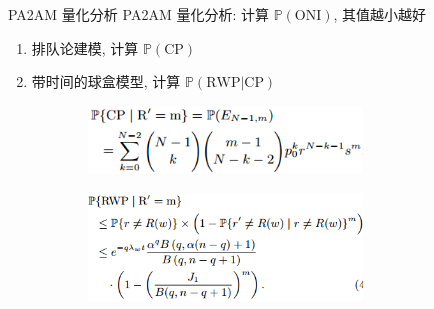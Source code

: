 \begin{frame}{PA2AM 量化分析}
  PA2AM 量化分析: 计算 $\mathbb{P}(\textrm{ONI})$, 其值越小越好

  \begin{enumerate}
	\setlength{\itemsep}{3pt}
	\item 排队论建模, 计算 $\mathbb{P}(\textrm{CP})$ 
	\item 带时间的球盒模型, 计算 $\mathbb{P}(\textrm{RWP|CP})$
  \end{enumerate}
  
  \vspace{0.30cm}

  \begin{figure}
	\begin{subfigure}{0.50\textwidth}
	  \centering
	  \includegraphics[width = 0.80\textwidth]{figures/cp.png}
	\end{subfigure}%
	\begin{subfigure}{0.50\textwidth}
	  \centering
	  \includegraphics[width = 0.80\textwidth]{figures/rwp.png}
	\end{subfigure}
  \end{figure}
\end{frame}
